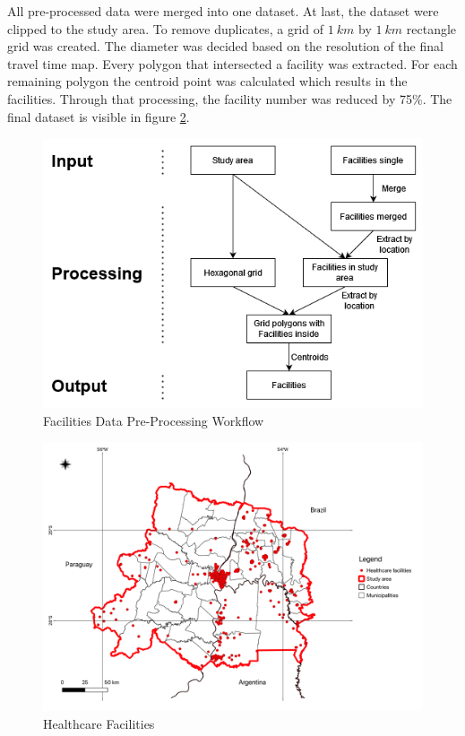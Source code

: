\documentclass[11pt, a4paper]{report}
\begin{document}
All pre-processed data were merged into one dataset. At last, the dataset were clipped to the study area.
To remove duplicates, a grid of $1 \ km$ by $1\ km$ rectangle grid was created. The diameter was decided based on the resolution of the final travel time map. Every polygon that intersected a facility was extracted. For each remaining polygon the centroid point was calculated which results in the facilities. Through that processing, the facility number was reduced by 75\%. The final dataset is visible in figure \ref{fig:healthcare}.\\ 
%
\begin{figure}[H]
  \centering
  \includegraphics[width=0.9\linewidth]{figures/facilitiesworkflow.png}
  \caption{Facilities Data Pre-Processing Workflow}
  \label{fig:facilitiesworkflow}
\end{figure}

\begin{figure}[H]
  \centering
  \includegraphics[width=0.9\linewidth]{figures/Healthcare Facilities.png}
  \caption{Healthcare Facilities}
  \label{fig:healthcare}
\end{figure}
\end{document}
